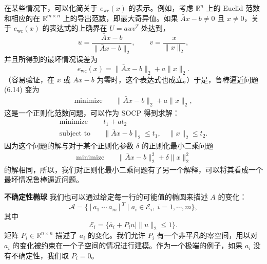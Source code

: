 \documentclass[UTF8,12pt,a4paper,fontset=fandol]{ctexart}
\begin{document}
在某些情况下，可以化简关于 $e_{\mathrm{wc}}(x)$ 的表示。例如，考虑 $\mathbb{R}^n$ 上的 Euclid 范数和相应的在 $\mathbb{R}^{m\times n}$ 上的导出范数，即最大奇异值。如果 $\bar{A}x-b\neq 0$ 且 $x\neq 0$，关于 $e_{\mathrm{wc}}(x)$ 的表达式的上确界在 $U=auv^T$ 处达到，
\[
u=\frac{\bar{A}x-b}{\|\bar{A}x-b\|_2},\qquad
v=\frac{x}{\|x\|_2},
\]
并且所得到的最坏情况误差为
\[
e_{\mathrm{wc}}(x)=\|\bar{A}x-b\|_2+a\|x\|_2.
\]
（容易验证，在 $x$ 或 $\bar{A}x-b$ 为零时，这个表达式也成立。）于是，鲁棒逼近问题 (6.14) 变为
\[
\begin{aligned}
\text{minimize}\quad & \|\bar{A}x-b\|_2+a\|x\|_2,
\end{aligned}
\]
这是一个正则化范数问题，可以作为 SOCP 得到求解：
\[
\begin{aligned}
\text{minimize}\quad & t_1+at_2\\
\text{subject to}\quad & \|\bar{A}x-b\|_2\leq t_1,\quad \|x\|_2\leq t_2.
\end{aligned}
\]
因为这个问题的解与对于某个正则化参数 $\delta$ 的正则化最小二乘问题
\[
\begin{aligned}
\text{minimize}\quad & \|\bar{A}x-b\|_2^2+\delta\|x\|_2^2
\end{aligned}
\]
的解相同，所以，我们对正则化最小二乘问题有了另一个解释，可以将其看成一个最坏情况鲁棒逼近问题。

\noindent\textbf{不确定性椭球}\quad
我们也可以通过给定每一行的可能值的椭圆来描述 $A$ 的变化：
\[
\mathcal{A}=\{[a_1\ \cdots\ a_m]^T\mid a_i\in\mathcal{E}_i,\ i=1,\cdots,m\},
\]
其中
\[
\mathcal{E}_i=\{\bar{a}_i+P_iu\mid \|u\|_2\leq 1\}.
\]
矩阵 $P_i\in\mathbb{R}^{n\times n}$ 描述了 $a_i$ 的变化。我们允许 $P_i$ 有一个非平凡的零空间，用以对 $a_i$ 的变化被约束在一个子空间的情况进行建模。作为一个极端的例子，如果 $a_i$ 没有不确定性，我们取 $P_i=0$。
\end{document}
